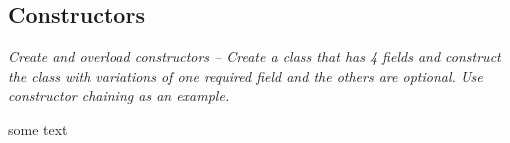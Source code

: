 \subsection{Constructors}
\textit{Create and overload constructors -- Create a class that has 4 fields and construct the class with variations of one required field and the others are optional.  Use constructor chaining as an example.}

some text
